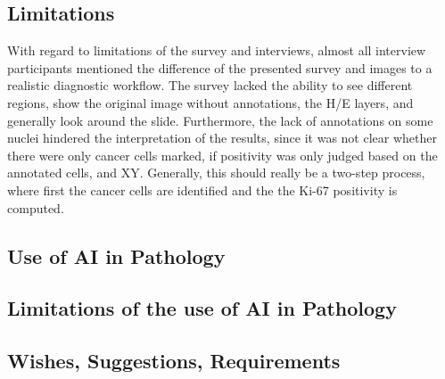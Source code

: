 
\subsection{Limitations}
\label{sec:Limitations}
With regard to limitations of the survey and interviews, almost all interview participants mentioned the difference of the presented survey and images to a realistic diagnostic workflow. The survey lacked the ability to see different regions, show the original image without annotations, the H/E layers, and generally look around the slide.
Furthermore, the lack of annotations on some nuclei hindered the interpretation of the results, since it was not clear whether there were only cancer cells marked, if positivity was only judged based on the annotated cells, and XY. Generally, this should really be a two-step process, where first the cancer cells are identified and the the Ki-67 positivity is computed.

\subsection{Use of AI in Pathology}


\subsection{Limitations of the use of AI in Pathology}


\subsection{Wishes, Suggestions, Requirements}



